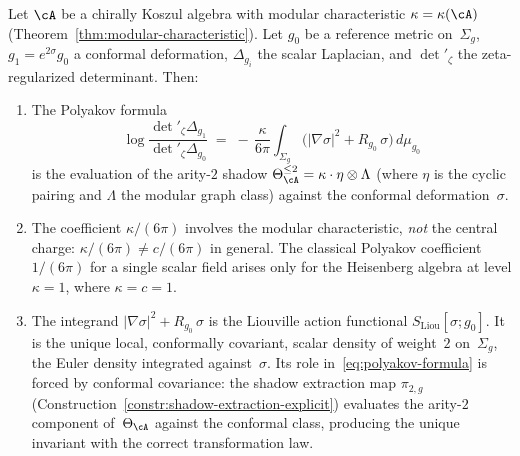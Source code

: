 \begin{proposition}
\label{prop:polyakov-arity-two-projection}
\ClaimStatusProvedElsewhere
{}
Let $\cA$ be a chirally Koszul algebra with modular characteristic
$\kappa = \kappa(\cA)$
\textup{(}Theorem~\textup{\ref{thm:modular-characteristic})}.
Let $g_0$ be a reference metric on~$\Sigma_g$, $g_1 = e^{2\sigma}g_0$
a conformal deformation, $\Delta_{g_i}$ the scalar Laplacian, and
$\det'{}_\zeta$ the zeta-regularized determinant.  Then:
\begin{enumerate}[label=\textup{(\roman*)}]
\item The Polyakov formula
\begin{equation}\label{eq:polyakov-formula}
  \log \frac{\det'{}_\zeta \Delta_{g_1}}{\det'{}_\zeta \Delta_{g_0}}
  \;=\;
  -\,\frac{\kappa}{6\pi}
  \int_{\Sigma_g}
  \bigl(|\nabla \sigma|^2 + R_{g_0}\,\sigma\bigr)\,
  d\mu_{g_0}
\end{equation}
is the evaluation of the arity-$2$ shadow
$\Theta_\cA^{\leq 2} = \kappa \cdot \eta \otimes \Lambda$
\textup{(}where $\eta$ is the cyclic pairing and $\Lambda$ the
modular graph class\textup{)} against the conformal
deformation~$\sigma$.

\item The coefficient $\kappa/(6\pi)$ involves the modular
characteristic, \emph{not} the central charge: $\kappa/(6\pi)
\neq c/(6\pi)$ in general.  The classical Polyakov coefficient
$1/(6\pi)$ for a single scalar field arises only for the
Heisenberg algebra at level $\kappa = 1$, where
$\kappa = c = 1$.

\item The integrand $|\nabla\sigma|^2 + R_{g_0}\,\sigma$ is the
Liouville action functional $S_{\mathrm{Liou}}[\sigma; g_0]$.
It is the unique local, conformally covariant, scalar density
of weight~$2$ on~$\Sigma_g$, the Euler density integrated
against~$\sigma$.  Its role in~\eqref{eq:polyakov-formula}
is forced by conformal covariance: the shadow extraction
map $\pi_{2,g}$
\textup{(}Construction~\textup{\ref{constr:shadow-extraction-explicit})}
evaluates the arity-$2$ component of~$\Theta_\cA$ against the
conformal class, producing the unique invariant with the
correct transformation law.
\end{enumerate}
\end{proposition}

